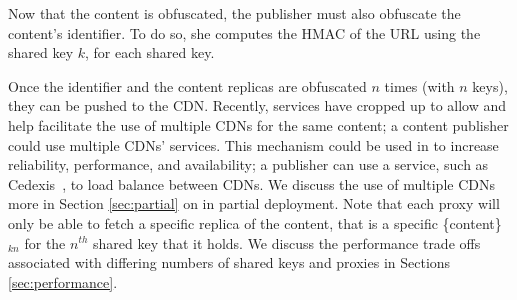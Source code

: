 Now that the content is obfuscated, the publisher must also obfuscate the content's identifier.  To do so, 
she computes the HMAC of the URL using the shared key $k$, for each shared key.

Once the identifier and the content replicas are obfuscated $n$ times (with $n$ keys), they can be pushed to the 
CDN.  Recently, services have cropped up to allow and help facilitate the use of multiple CDNs for the same content; a content 
publisher could use multiple CDNs' services.  This mechanism could be used in \system{} to increase reliability, 
performance, and availability; a publisher can use a service, such as Cedexis~\cite{cedexis}, to load balance between 
CDNs.  We discuss the use of multiple CDNs more in Section \ref{sec:partial} on \system{} in 
partial deployment.  Note that each proxy will only be able to fetch a specific replica of the content, that is a 
specific \{content\}$_{kn}$ for the $n^{th}$ shared key that it holds.  We discuss the performance trade offs 
associated with differing numbers of shared keys and proxies in Sections \ref{sec:performance}.


